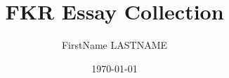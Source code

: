 \newcommand{\authorname}{FirstName LASTNAME}
\newcommand{\universityname}{Example University}
\newcommand{\facultyname}{Master's Degree -- Computer Science}

\title{FKR Essay Collection}
\author{\authorname}
\date{\today}
\newcommand{\university}{\universityname}
\newcommand{\program}{\facultyname}
